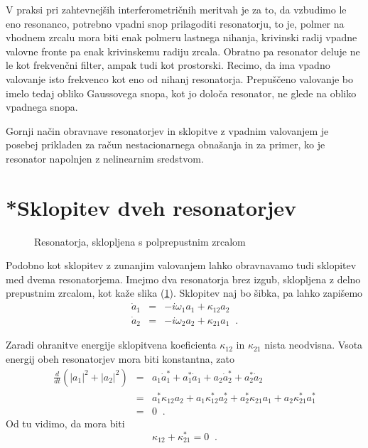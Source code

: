 V praksi pri zahtevnejših interferometričnih meritvah je za to, da
vzbudimo le eno resonanco, potrebno vpadni snop prilagoditi resonatorju,
to je, polmer na vhodnem zrcalu mora biti enak polmeru lastnega nihanja,
krivinski radij vpadne valovne fronte pa enak krivinskemu radiju zrcala.
Obratno pa resonator deluje ne le kot frekvenčni filter, ampak tudi
kot prostorski. Recimo, da ima vpadno valovanje isto frekvenco kot
eno od nihanj resonatorja. Prepuščeno valovanje bo imelo tedaj obliko
Gaussovega snopa, kot jo določa resonator, ne glede na obliko vpadnega
snopa.

Gornji način obravnave resonatorjev in sklopitve z vpadnim valovanjem
je posebej prikladen za račun nestacionarnega obnašanja in za primer,
ko je resonator napolnjen z nelinearnim sredstvom.


\section{*Sklopitev dveh resonatorjev}

\begin{figure}
 \caption{Resonatorja, sklopljena s polprepustnim zrcalom}


\label{sl3.5}\vskip7cm 
\end{figure}


Podobno kot sklopitev z zunanjim valovanjem lahko obravnavamo tudi
sklopitev med dvema resonatorjema. Imejmo dva resonatorja brez izgub,
sklopljena z delno prepustnim zrcalom, kot kaže slika (\ref{sl3.5}).
Sklopitev naj bo šibka, pa lahko zapišemo 
\begin{eqnarray}
\dot{a}_{1} & = & -i\omega_{1}a_{1}+\kappa_{12}a_{2}\nonumber \\
\dot{a}_{2} & = & -i\omega_{2}a_{2}+\kappa_{21}a_{1}\;\;.
\end{eqnarray}

Zaradi ohranitve energije sklopitvena koeficienta $\kappa_{12}$ in
$\kappa_{21}$ nista neodvisna. Vsota energij obeh resonatorjev mora
biti konstantna, zato 
\begin{eqnarray}
\frac{d}{dt}(|a_{1}|^{2}+|a_{2}|^{2}) & = & a_{1}\dot{a}_{1}^{*}+a_{1}^{*}\dot{a}_{1}+
a_{2}\dot{a}_{2}^{*}+a_{2}^{*}\dot{a}_{2}\nonumber \\
 & = & a_{1}^{*}\kappa_{12}a_{2}+a_{1}\kappa_{12}^{*}a_{2}^{*}+a_{2}^{*}\kappa_{21}a_{1}+
 a_{2}\kappa_{21}^{*}a_{1}^{*}\nonumber \\
 & = & 0\;\;.
\end{eqnarray}
 Od tu vidimo, da mora biti 
\begin{equation}
\kappa_{12}+\kappa_{21}^{*}=0\;\;.\label{3.56}
\end{equation}

